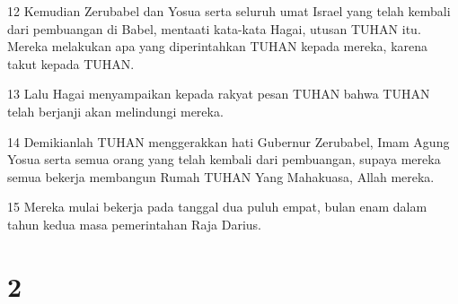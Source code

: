 \par 12 Kemudian Zerubabel dan Yosua serta seluruh umat Israel yang telah kembali dari pembuangan di Babel, mentaati kata-kata Hagai, utusan TUHAN itu. Mereka melakukan apa yang diperintahkan TUHAN kepada mereka, karena takut kepada TUHAN.
\par 13 Lalu Hagai menyampaikan kepada rakyat pesan TUHAN bahwa TUHAN telah berjanji akan melindungi mereka.
\par 14 Demikianlah TUHAN menggerakkan hati Gubernur Zerubabel, Imam Agung Yosua serta semua orang yang telah kembali dari pembuangan, supaya mereka semua bekerja membangun Rumah TUHAN Yang Mahakuasa, Allah mereka.
\par 15 Mereka mulai bekerja pada tanggal dua puluh empat, bulan enam dalam tahun kedua masa pemerintahan Raja Darius.

\chapter{2}

